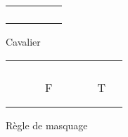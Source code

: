 \documentclass[a4paper,11pt]{article}
\begin{document}
\begin{figure}[h]
\begin{minipage}{.3\linewidth}
\begin{tabular}{|p{0.1cm}|p{0.1cm}|p{0.1cm}|p{0.1cm}|p{0.1cm}|}
                    \hline
                     &\cellcolor{green!25}& &\cellcolor{green!25}& \\
                    \hline
                    \cellcolor{green!25}& & & &\cellcolor{green!25}\\
                    \hline
                     & &\cellcolor{black!20}& & \\
                    \hline
                    \cellcolor{green!25}& & & &\cellcolor{green!25}\\
                    \hline
                     &\cellcolor{green!25}& &\cellcolor{green!25}& \\
                    \hline
                \end{tabular}
                \caption{Cavalier}
                \label{fig:Cavalier}
              \end{minipage}
          \end{figure}
      
        \begin{figure}[!htb]
            \centering
            \begin{tabular}{|p{0.1cm}|p{0.1cm}|p{0.1cm}|p{0.1cm}|p{0.1cm}|p{0.1cm}|p{0.1cm}|p{0.1cm}|}
                \hline
                 & & & & & &\cellcolor{green!25}& \\
                \hline
                 & & & & & &\cellcolor{green!25}& \\
                \hline
                 & & & & & &\cellcolor{green!25}& \\
                \hline
                 &\cellcolor{green!25}& &\cellcolor{green!25}& & &\cellcolor{green!25}& \\
                \hline
                \cellcolor{green!25}& & & &\cellcolor{green!25}& &\cellcolor{green!25}& \\
                \hline
                \cellcolor{red!25}~&\cellcolor{red!25}~&\cellcolor{black!25}F &\cellcolor{green!25}&\cellcolor{green!25}&\cellcolor{green!25}&\cellcolor{black!25}T&\cellcolor{green!25}\\
                \hline
                \cellcolor{green!25}& & & &\cellcolor{green!25}& &\cellcolor{green!25}& \\
                \hline
                 &\cellcolor{green!25}& &\cellcolor{green!25}& & &\cellcolor{green!25}& \\
                \hline
            \end{tabular}
            \caption{Règle de masquage}
            \label{fig:masquage}
        \end{figure}
        
\end{document}
